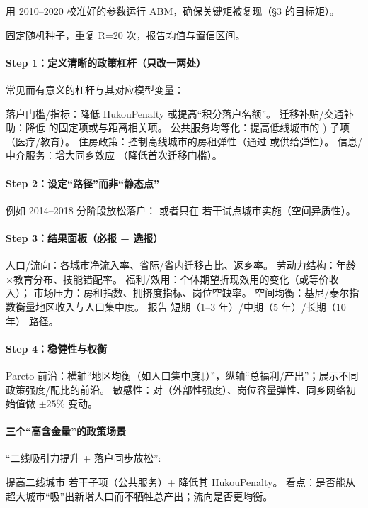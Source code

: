 \documentclass[
  a4paper,
  zihao=-4,
  fontset=mac,
  AutoFakeBold,
  AutoFakeSlant,
  oneside]{ctexbook}
\begin{document}
用 2010–2020 校准好的参数运行 ABM，确保关键矩被复现（§3 的目标矩）。

固定随机种子，重复 
R=20 次，报告均值与置信区间。

\paragraph{Step 1：定义清晰的政策杠杆（只改一两处）}

常见而有意义的杠杆与其对应模型变量：

落户门槛/指标：降低 
HukouPenalty 或提高“积分落户名额”。
迁移补贴/交通补助：降低 
的固定项或与距离相关项。
公共服务均等化：提高低线城市的 ) 子项（医疗/教育）。
住房政策：控制高线城市的房租弹性（通过  或供给弹性）。
信息/中介服务：增大同乡效应 （降低首次迁移门槛）。

\paragraph{Step 2：设定“路径”而非“静态点”}

例如 2014–2018 分阶段放松落户：
或者只在 若干试点城市实施（空间异质性）。

\paragraph{Step 3：结果面板（必报 + 选报）}

人口/流向：各城市净流入率、省际/省内迁移占比、返乡率。
劳动力结构：年龄×教育分布、技能错配率。
福利/效用：个体期望折现效用的变化（或等价收入）；
市场压力：房租指数、拥挤度指标、岗位空缺率。
空间均衡：基尼/泰尔指数衡量地区收入与人口集中度。
报告 短期（1–3 年）/中期（5 年）/长期（10 年） 路径。

\paragraph{Step 4：稳健性与权衡}

Pareto 前沿：横轴“地区均衡（如人口集中度↓）”，纵轴“总福利/产出”；展示不同政策强度/配比的前沿。
敏感性：对（外部性强度）、岗位容量弹性、同乡网络初始值做 $\pm 25\%$ 变动。

\paragraph{三个“高含金量”的政策场景}

“二线吸引力提升 + 落户同步放松”:

提高二线城市  若干子项（公共服务）+ 降低其 HukouPenalty。
看点：是否能从超大城市“吸”出新增人口而不牺牲总产出；流向是否更均衡。
\end{document}
